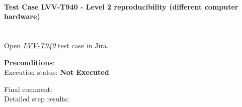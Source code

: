 \documentclass[DM,lsstdraft,STR,toc]{lsstdoc}
\begin{document}
    \paragraph{Test Case LVV-T940 - Level 2 reproducibility (different computer hardware)
 }\mbox{}\\

Open  \href{https://jira.lsstcorp.org/secure/Tests.jspa#/testCase/LVV-T940}{\textit{ LVV-T940 } }
test case in Jira.

    

    \textbf{ Preconditions}:\\
    

    Execution status: {\bf Not Executed }

    Final comment:\\


    Detailed step results:
\end{document}
